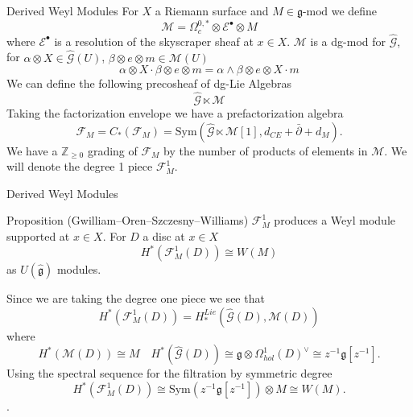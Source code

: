 \documentclass{beamer}
\newcommand{\Z}{\mathbb{Z}}
\begin{document}
\begin{frame}{Derived Weyl Modules}
    For $X$ a Riemann surface and $M\in \mathfrak{g}\mbox{-mod}$ we define
    \[
        \mathcal{M} =\Omega^{0,*}_c\otimes \mathcal{E}^\bullet \otimes M
    \]
    where $\mathcal{E}^\bullet$ is a resolution of the skyscraper sheaf at $x \in X$. $\mathcal{M}$ is a dg-mod for $\hat{\mathcal{G}}$, for $\alpha \otimes X \in \hat{\mathcal{G}}(U)$, $\beta \otimes e \otimes m \in \mathcal{M}(U)$
    \[
    \alpha \otimes X \cdot \beta \otimes e \otimes m = \alpha \wedge \beta \otimes e \otimes X \cdot m
    \]
    \pause
     We can define the following precosheaf of dg-Lie Algebras
    \[
        \hat{\mathcal{G}}   \ltimes \mathcal{M}
    \]
    Taking the factorization envelope we have a prefactorization algebra
    \[
        \mathcal{F}_M = C_* (\mathcal{F}_M)= \mathrm{Sym}(\hat{\mathcal{G}}   \ltimes \mathcal{M}[1],d_{CE}+\bar{\partial}+d_{M}).
    \]
    We have a $\Z_{\geq 0}$ grading of $\mathcal{F}_M$ by the number of products of elements in $\mathcal{M}$. We will denote the degree 1 piece $\mathcal{F}_M^1$.
\end{frame}

\begin{frame}{Derived Weyl Modules}
    
    \begin{block}{Proposition (Gwilliam--Oren--Szczesny--Williams)}
        $\mathcal{F}^1_M$ produces a Weyl module supported at $x\in X$. For $D$ a disc at $x \in X$ 
        \[
            H^*(\mathcal{F}_M^{1}(D))\cong W(M)
        \]
        as $U(\hat{\mathfrak{g}})$ modules.
    \end{block}
    Since we are taking the degree one piece we see that
    \[
        H^*(\mathcal{F}_M^1(D))= H_*^{Lie}(\hat{\mathcal{G}}(D) , \mathcal{M}(D))
    \]
    where 
    \[H^*(\mathcal{M}(D)) \cong M \quad H^*(\hat{\mathcal{G}}(D))\cong \mathfrak{g} \otimes \Omega_{hol}^1(D)^{\vee}\cong z^{-1}\mathfrak{g}[z^{-1}].\] 
    Using the spectral sequence for the filtration by symmetric degree \[
    H^*(\mathcal{F}^1_{M}(D)) \cong \mbox{Sym}(z^{-1}\mathfrak{g}[z^{-1}]) \otimes M \cong W(M).
    \].
\end{frame}
\end{document}
